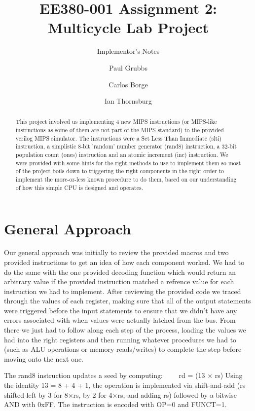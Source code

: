 \documentclass[acmtog]{acmart}
\begin{document}

\title{EE380-001 Assignment 2: Multicycle Lab Project}
\subtitle{Implementor's Notes}

\author{Paul Grubbs}
\author{Carlos Borge}
\author{Ian Thornsburg}

\begin{abstract}
  This project involved us implementing 4 new MIPS instructions (or MIPS-like instructions as some of them are not part of the MIPS standard)
  to the provided verilog MIPS simulator. The instructions were a Set Less Than Immediate (slti) instruction, a simplistic 8-bit 'random' number generator
  (rand8) instruction, a 32-bit population count (ones) instruction and an atomic increment (inc) instruction. We were provided with some hints for 
  the right methods to use to implement them so most of the project boils down to triggering the right components in the right order to 
  implement the more-or-less known procedure to do them, based on our understanding of how this simple CPU is designed and operates.
\end{abstract}

\maketitle

\section{General Approach}
Our general approach was initially to review the provided macros and two provided instructions to get an idea of how each component worked. We had to 
do the same with the one provided decoding function which would return an arbitrary value if the provided instruction matched a refrence value for 
each instruction we had to implement. After reviewing the provided code we traced through the values of each register, making sure that all of the 
output statements were triggered before the input statements to ensure that we didn't have any errors associated with when values were actually latched 
from the bus. From there we just had to follow along each step of the process, loading the values we had into the right registers and then running whatever
procedures we had to (such as ALU operations or memory reads/writes) to complete the step before moving onto the next one.

The rand8 instruction updates a seed by computing:
  rd = (13 × rs) %
Using the identity 13 = 8 + 4 + 1, the operation is implemented via shift-and-add (rs shifted left by 3 for 8×rs, by 2 for 4×rs, and adding rs) followed by a bitwise AND with 0xFF. The instruction is encoded with OP=0 and FUNCT=1.
\end{document}
